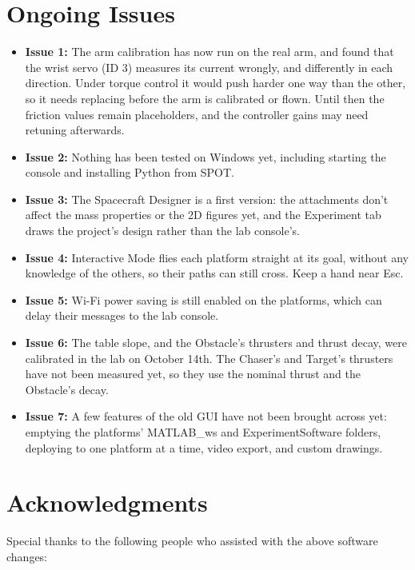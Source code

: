 \documentclass[11pt]{article}
\begin{document}
\section*{\textcolor{primaryColor}{Ongoing Issues}}
\begin{itemize}[label={\textcolor{primaryColor}{\textbullet}}]
    \item \textbf{Issue 1:} The arm calibration has now run on the real arm, and found that the wrist servo (ID 3) measures its current wrongly, and differently in each direction. Under torque control it would push harder one way than the other, so it needs replacing before the arm is calibrated or flown. Until then the friction values remain placeholders, and the controller gains may need retuning afterwards.
    \item \textbf{Issue 2:} Nothing has been tested on Windows yet, including starting the console and installing Python from SPOT.
    \item \textbf{Issue 3:} The Spacecraft Designer is a first version: the attachments don't affect the mass properties or the 2D figures yet, and the Experiment tab draws the project's design rather than the lab console's.
    \item \textbf{Issue 4:} Interactive Mode flies each platform straight at its goal, without any knowledge of the others, so their paths can still cross. Keep a hand near Esc.
    \item \textbf{Issue 5:} Wi-Fi power saving is still enabled on the platforms, which can delay their messages to the lab console.
    \item \textbf{Issue 6:} The table slope, and the Obstacle's thrusters and thrust decay, were calibrated in the lab on October 14th. The Chaser's and Target's thrusters have not been measured yet, so they use the nominal thrust and the Obstacle's decay.
    \item \textbf{Issue 7:} A few features of the old GUI have not been brought across yet: emptying the platforms' MATLAB\_ws and ExperimentSoftware folders, deploying to one platform at a time, video export, and custom drawings.
\end{itemize}

\section*{\textcolor{primaryColor}{Acknowledgments}}
Special thanks to the following people who assisted with the above software changes:
\end{document}
